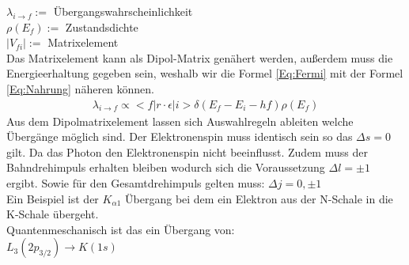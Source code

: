 $\lambda_{i\rightarrow f} := $ Übergangswahrscheinlichkeit\\
$\rho(E_{f}):= $ Zustandsdichte \\
$\vert V_{f i} \vert := $ Matrixelement \\ 
Das Matrixelement kann als Dipol-Matrix genähert werden, außerdem muss die Energieerhaltung gegeben sein, weshalb wir die Formel \ref{Eq:Fermi} mit der Formel \ref{Eq:Nahrung} näheren können.
\begin{align}
\label{Eq:Nahrung}
\lambda_{i\rightarrow f} \propto <f \vert r \cdot \epsilon \vert i > \delta ( E_{f} - E_{i} - hf) \rho(E_{f})
\end{align}
Aus dem Dipolmatrixelement lassen sich Auswahlregeln ableiten welche Übergänge möglich sind.
Der Elektronenspin muss identisch sein so das $ \Delta s= 0 $
gilt. Da das Photon den Elektronenspin nicht beeinflusst. Zudem muss der Bahndrehimpuls erhalten bleiben wodurch sich die Voraussetzung $ \Delta l = \pm 1 $  ergibt.
Sowie für den Gesamtdrehimpuls gelten muss: $\Delta j = 0,\pm1 $ \\
Ein Beispiel ist der $K_{\alpha 1}$ Übergang bei dem ein Elektron aus der N-Schale in die K-Schale übergeht.\\
Quantenmeschanisch ist das ein Übergang von:\\ $L_{3}(2p_{3/2}) \rightarrow K(1s)$

